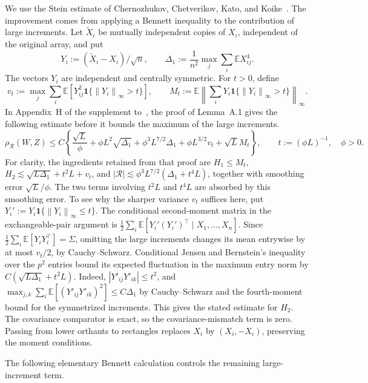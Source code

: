 \documentclass[11pt,letterpaper]{article}
\theoremstyle{remark}
\newcommand{\E}{\mathbb E}
\newcommand{\norm}[1]{\left\lVert#1\right\rVert}
\newcommand{\rh}{\rho_{\mathcal R}}
\newcommand{\ind}{\mathbf 1}
\begin{document}
We use the Stein estimate of Chernozhukov, Chetverikov, Kato, and
Koike~\cite{CCKK2022}. The improvement comes from applying a Bennett
inequality to the contribution of large increments. Let \(\widetilde X_i\) be mutually
independent copies of \(X_i\), independent of the original array, and
put
\[
 Y_i:=(\widetilde X_i-X_i)/\sqrt n,\qquad
 \Delta_1:=\frac1{n^2}\max_j\sum_i\E X_{ij}^4.
\]
The vectors \(Y_i\) are independent and centrally symmetric. For \(t>0\),
define
\[
 v_t:=\max_j\sum_i\E[Y_{ij}^2\ind\{\norm{Y_i}_\infty>t\}],
 \qquad M_t:=\E\norm{\sum_iY_i\ind\{\norm{Y_i}_\infty>t\}}_\infty.
\]
In Appendix~H of the supplement to~\cite{CCKK2022}, the proof of
Lemma~A.1 gives the following estimate before it bounds the maximum of
the large increments.
\begin{equation}
 \rh(W,Z)\le C\left\{
 \frac{\sqrt L}{\phi}+\phi L^2\sqrt{\Delta_1}
 +\phi^3L^{7/2}\Delta_1+\phi L^{3/2}v_t+\sqrt L M_t\right\},
 \qquad t:=(\phi L)^{-1},\quad\phi>0.
 \label{ben:master}
\end{equation}
For clarity, the ingredients retained from that proof are
\(H_1\le M_t\),
\(H_2\lesssim\sqrt{L\Delta_1}+t^2L+v_t\), and
\(|\mathcal R|\lesssim\phi^3L^{7/2}(\Delta_1+t^4L)\), together
with smoothing error \(\sqrt L/\phi\). The two terms involving
\(t^2L\) and \(t^4L\) are absorbed by this smoothing error.
To see why the sharper variance $v_t$ suffices here, put
$Y_i':=Y_i\ind\{\norm{Y_i}_\infty\le t\}$. The conditional second-moment matrix
in the exchangeable-pair argument is
$\frac12\sum_i\E[Y_i'(Y_i')^\top\mid X_1,\ldots,X_n]$.
Since $\frac12\sum_i\E[Y_iY_i^\top]=\Sigma$, omitting the large
increments changes its mean entrywise by at most $v_t/2$, by
Cauchy--Schwarz. Conditional Jensen and Bernstein's inequality over
the $p^2$ entries bound its expected fluctuation in the maximum entry
norm by $C(\sqrt{L\Delta_1}+t^2L)$. Indeed,
$|Y'_{ij}Y'_{ik}|\le t^2$, and
$\max_{j,k}\sum_i\E[(Y'_{ij}Y'_{ik})^2]\le C\Delta_1$
by Cauchy--Schwarz and the fourth-moment bound for the symmetrized
increments. This gives the stated estimate for $H_2$.
The covariance comparator is exact, so the covariance-mismatch term
is zero. Passing from lower orthants to rectangles replaces \(X_i\)
by \((X_i,-X_i)\), preserving the moment conditions.

The following elementary Bennett calculation controls the remaining
large-increment term.
\end{document}
